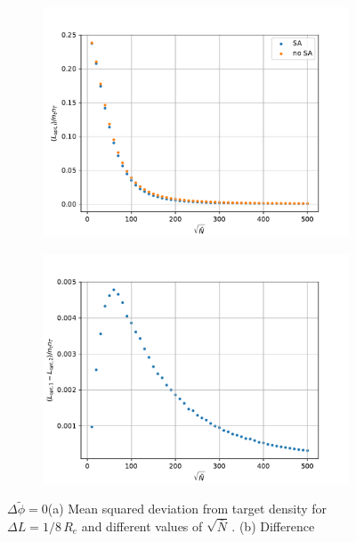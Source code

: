 \documentclass[bachelor,       %
               twoside,        %
               BCOR10mm,       %
               ngerman, english %
               ]{GAUBM}
\begin{document}
\begin{figure}[h]
  \centering
  \begin{subfigure}[b]{0.45\textwidth}
      \centering
      \includegraphics[width=\textwidth]{figures/opt_var_nbar_dphi0.pdf}
      \caption{}
      \label{fig:opt_var_nbar_dphi0}
  \end{subfigure}
    \hfill
  \begin{subfigure}[b]{0.45\textwidth}
      \centering
      \includegraphics[width=\textwidth]{figures/diff_var_nbar_dphi0.pdf}
      \caption{}
      \label{fig:diff_var_nbar_dphi0}
  \end{subfigure}
     \caption{$\Delta\tilde\phi=0 $(a) Mean squared deviation from target density for $\Delta L=1/8\,R_e$ and different values of $\sqrt{\bar N}\,.$ (b) Difference}
     \label{fig:var_nbar_dphi0}
\end{figure}
\end{document}
